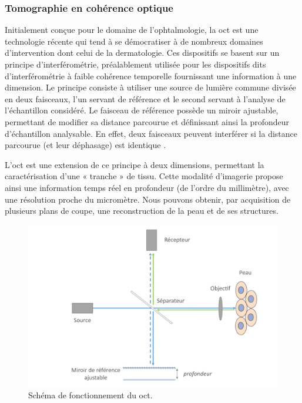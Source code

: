 \subsubsection{Tomographie en cohérence optique}
Initialement conçue pour le domaine de l’ophtalmologie, la \gls{oct} est une technologie récente qui tend à se démocratiser à de nombreux domaines d’intervention dont celui de la dermatologie. Ces dispositifs se basent sur un principe d’interférométrie, préalablement utilisée pour les dispositifs dits d’interférométrie à faible cohérence temporelle fournissant une information à une dimension. Le principe consiste à utiliser une source de lumière commune divisée en deux faisceaux, l’un servant de référence et le second servant à l’analyse de l’échantillon considéré. Le faisceau de référence possède un miroir ajustable, permettant de modifier sa distance parcourue et définissant ainsi la profondeur d’échantillon analysable. En effet, deux faisceaux peuvent interférer si la distance parcourue (et leur déphasage) est identique .\par
L’\gls{oct} est une extension de ce principe à deux dimensions, permettant la caractérisation d’une « tranche » de tissu. Cette modalité d’imagerie propose ainsi une information temps réel en profondeur (de l’ordre du millimètre), avec une résolution proche du micromètre. Nous pouvons obtenir, par acquisition de plusieurs plans de coupe, une reconstruction de la peau et de ses structures.\par
\begin{figure}[H]
    \centering
    \includegraphics[width=0.8\linewidth]{contents/chapter_2/resources/oct_principle.pdf}
    \caption{Schéma de fonctionnement du \gls{oct}.}
    \label{fig:oct_principle}
\end{figure}\par

